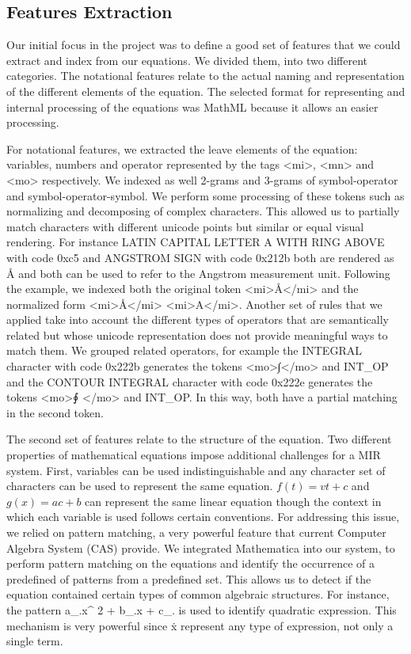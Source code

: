 \documentclass{sig-alternate}
\begin{document}
\subsection{Features Extraction}
Our initial focus in the project was to define a good set of features that we could extract and index from our equations. We divided them, into two different categories. The notational features relate to the actual naming and representation of the different elements of the equation. The selected format for representing and internal processing of the equations was MathML because it allows an easier processing. 

For notational features, we extracted the leave elements of the equation: variables, numbers and operator represented by the tags <mi>, <mn> and <mo> respectively. We indexed as well 2-grams and 3-grams of symbol-operator and symbol-operator-symbol.
We perform some processing of these tokens such as normalizing and decomposing of complex characters. This allowed us to partially match characters with different unicode points but similar or equal visual rendering. For instance LATIN CAPITAL LETTER A WITH RING ABOVE with code 0xc5 and ANGSTROM SIGN with code 0x212b both are rendered as \r{A} and both can be used to refer to the Angstrom measurement unit. Following the example, we indexed both the original token <mi>\r{A}</mi> and the normalized form <mi>\r{A}</mi> <mi>A</mi>. Another set of rules that we applied take into account the different types of operators that are semantically related but whose unicode representation does not provide meaningful ways to match them. We grouped related operators, for example the INTEGRAL character with code 0x222b generates the tokens <mo>{\unicodefont ∫}</mo> and INT\_OP and the CONTOUR INTEGRAL character with code 0x222e generates the tokens <mo>{\unicodefont ∮} </mo> and INT\_OP. In this way, both have a partial matching in the second token.

The second set of features relate to the structure of the equation. Two different properties of mathematical equations impose additional challenges for a MIR system. First, variables can be used indistinguishable and any character set of characters can be used to represent the same equation. $f(t) = vt + c $ and $g(x) = ac + b$ can represent the same linear equation though the context in which each variable is used follows certain conventions. For addressing this issue, we relied on pattern matching, a very powerful feature that current Computer Algebra System (CAS) provide. We integrated Mathematica into our system, to perform pattern matching on the equations and identify the occurrence of a predefined of patterns from a predefined set. This allows us to detect if the equation contained certain types of common algebraic structures. For instance, the pattern {\codefont a\_.x\^{} 2 + b\_.x + c\_.} is used to identify quadratic expression. This mechanism is very powerful since \.x represent any type of expression, not only a single term. 
\end{document}
